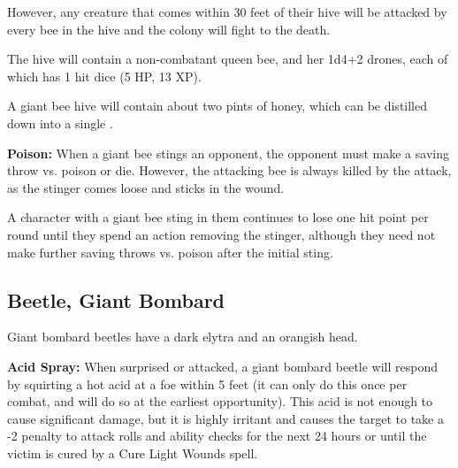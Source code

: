 \begin{multicols*}{2}
However, any creature that comes within 30 feet of their hive will be attacked by every bee in the hive and the colony will fight to the death.

The hive will contain a non-combatant queen bee, and her 1d4+2 drones, each of which has 1 hit dice (5 HP, 13 XP).

A giant bee hive will contain about two pints of honey, which can be distilled down into a single .

\textbf{Poison:} When a giant bee stings an opponent, the opponent must make a saving throw vs. poison or die. However, the attacking bee is always killed by the attack, as the stinger comes loose and sticks in the wound.

A character with a giant bee sting in them continues to lose one hit point per round until they spend an action removing the stinger, although they need not make further saving throws vs. poison after the initial sting.

\subsection{Beetle, Giant Bombard}

Giant bombard beetles have a dark elytra and an orangish head.

\textbf{Acid Spray:} When surprised or attacked, a giant bombard beetle will respond by squirting a hot acid at a foe within 5 feet (it can only do this once per combat, and will do so at the earliest opportunity). This acid is not enough to cause significant damage, but it is highly irritant and causes the target to take a -2 penalty to attack rolls and ability checks for the next 24 hours or until the victim is cured by a Cure Light Wounds spell.


\end{multicols*}
